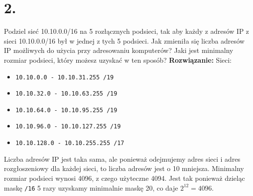 \documentclass{article}
\begin{document}
\section*{2.}
Podziel sieć 10.10.0.0/16 na 5 rozłącznych podsieci, tak aby każdy z adresów IP z sieci 10.10.0.0/16 był w jednej z tych 5 podsieci. Jak zmieniła się liczba adresów IP możliwych do użycia przy adresowaniu komputerów? Jaki jest minimalny rozmiar podsieci, który możesz uzyskać w ten sposób?
\newline
\textbf{Rozwiązanie:}
Sieci:
\begin{itemize}
    \item \texttt{10.10.0.0 - 10.10.31.255 /19}
    \item \texttt{10.10.32.0 - 10.10.63.255 /19}
    \item \texttt{10.10.64.0 - 10.10.95.255 /19}
    \item \texttt{10.10.96.0 - 10.10.127.255 /19}
    \item \texttt{10.10.128.0 - 10.10.255.255 /17}
\end{itemize}
Liczba adresów IP jest taka sama, ale ponieważ odejmujemy adres sieci i adres rozgłoszeniowy dla każdej sieci, to liczba adresów jest o 10 mniejsza. Minimalny rozmiar podsieci wynosi 4096, z czego użyteczne 4094. Jest tak ponieważ dzieląc maskę \texttt{/16} 5 razy uzyskamy minimalnie maskę 20, co daje $2^12=4096$. 
\end{document}
